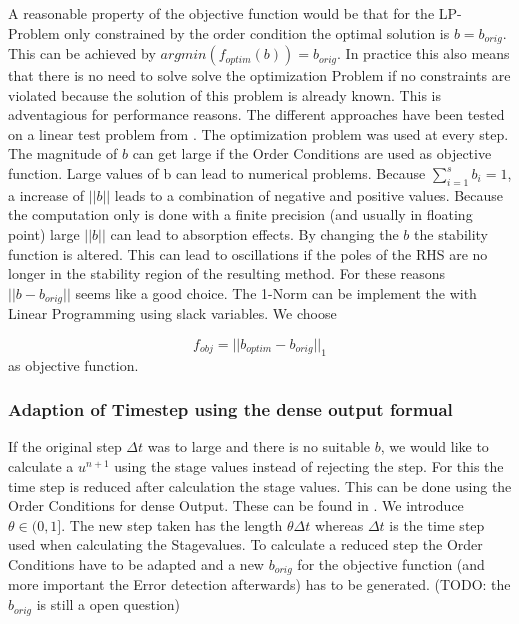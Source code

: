 \documentclass{article}
\begin{document}
A reasonable property of the objective function would be that for the LP-Problem only constrained by the order condition the optimal solution is $b = b_{orig}$. 
This can be achieved by $argmin(f_{optim}(b)) = b_{orig}$. 
In practice this also means that there is no need to solve solve the optimization Problem if no constraints are violated because the solution of this problem is already known. This is adventagious for performance reasons.
The different approaches have been tested on a linear test problem from \cite{kopecz_unconditionally_2018}. The optimization problem was used at every step.
The magnitude of $b$ can get large if the Order Conditions are used as objective function.
Large values of b can lead to numerical problems. Because $\sum_{i  = 1}^s b_i = 1$, a increase of $||b||$ leads to a combination of negative and positive values. Because the computation only is done with a finite precision (and usually in floating point) large $||b||$ can lead to absorption effects.    
By changing the $b$ the stability function is altered. This can lead to oscillations if the poles of the RHS are no longer in the stability region of the resulting method.
For these reasons $||b-b_{orig}||$ seems like a good choice. The 1-Norm can be implement the with Linear Programming using slack variables. We choose 

\begin{equation}
f_{obj} = ||b_{optim}-b_{orig}||_1
\end{equation}
 as objective function.




\subsubsection{Adaption of Timestep using the dense output formual}

If the original step $\Delta t$ was to large and there is no suitable $b$, we would like to calculate a $u^{n+1}$ using the stage values instead of rejecting the step. For this the time step is reduced after calculation the stage values. This can be done using the Order Conditions for dense Output. These can be found in \cite{hairer_runge-kutta_1993}.
We introduce $\theta \in (0,1]$. The new step taken has the length $\theta \Delta t$ whereas $\Delta t$ is the time step used when calculating the Stagevalues.
To calculate a reduced step the Order Conditions have to be adapted and a new $b_{orig}$ for the objective function (and more important the Error detection afterwards) has to be generated. 
(TODO: the $b_{orig}$ is still a open question)
\end{document}
